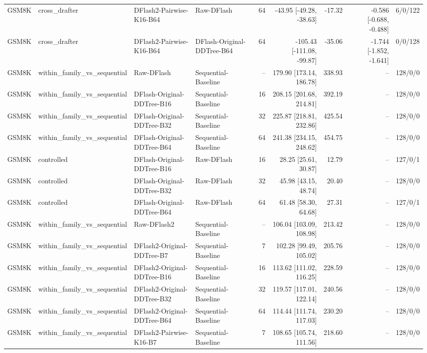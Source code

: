 \begin{longtable}{llllrrrrr}
GSM8K & cross\_drafter & DFlash2-Pairwise-K16-B64 & Raw-DFlash & 64 & -43.95 [-49.28, -38.63] & -17.32 & -0.586 [-0.688, -0.488] & 6/0/122 \\
GSM8K & cross\_drafter & DFlash2-Pairwise-K16-B64 & DFlash-Original-DDTree-B64 & 64 & -105.43 [-111.08, -99.87] & -35.06 & -1.744 [-1.852, -1.641] & 0/0/128 \\
GSM8K & within\_family\_vs\_sequential & Raw-DFlash & Sequential-Baseline & -- & 179.90 [173.14, 186.78] & 338.93 & -- & 128/0/0 \\
GSM8K & within\_family\_vs\_sequential & DFlash-Original-DDTree-B16 & Sequential-Baseline & 16 & 208.15 [201.68, 214.81] & 392.19 & -- & 128/0/0 \\
GSM8K & within\_family\_vs\_sequential & DFlash-Original-DDTree-B32 & Sequential-Baseline & 32 & 225.87 [218.81, 232.86] & 425.54 & -- & 128/0/0 \\
GSM8K & within\_family\_vs\_sequential & DFlash-Original-DDTree-B64 & Sequential-Baseline & 64 & 241.38 [234.15, 248.62] & 454.75 & -- & 128/0/0 \\
GSM8K & controlled & DFlash-Original-DDTree-B16 & Raw-DFlash & 16 & 28.25 [25.61, 30.87] & 12.79 & -- & 127/0/1 \\
GSM8K & controlled & DFlash-Original-DDTree-B32 & Raw-DFlash & 32 & 45.98 [43.15, 48.74] & 20.40 & -- & 128/0/0 \\
GSM8K & controlled & DFlash-Original-DDTree-B64 & Raw-DFlash & 64 & 61.48 [58.30, 64.68] & 27.31 & -- & 127/0/1 \\
GSM8K & within\_family\_vs\_sequential & Raw-DFlash2 & Sequential-Baseline & -- & 106.04 [103.09, 108.98] & 213.42 & -- & 128/0/0 \\
GSM8K & within\_family\_vs\_sequential & DFlash2-Original-DDTree-B7 & Sequential-Baseline & 7 & 102.28 [99.49, 105.02] & 205.76 & -- & 128/0/0 \\
GSM8K & within\_family\_vs\_sequential & DFlash2-Original-DDTree-B16 & Sequential-Baseline & 16 & 113.62 [111.02, 116.25] & 228.59 & -- & 128/0/0 \\
GSM8K & within\_family\_vs\_sequential & DFlash2-Original-DDTree-B32 & Sequential-Baseline & 32 & 119.57 [117.01, 122.14] & 240.56 & -- & 128/0/0 \\
GSM8K & within\_family\_vs\_sequential & DFlash2-Original-DDTree-B64 & Sequential-Baseline & 64 & 114.44 [111.74, 117.03] & 230.20 & -- & 128/0/0 \\
GSM8K & within\_family\_vs\_sequential & DFlash2-Pairwise-K16-B7 & Sequential-Baseline & 7 & 108.65 [105.74, 111.56] & 218.60 & -- & 128/0/0 \\

\end{longtable}
